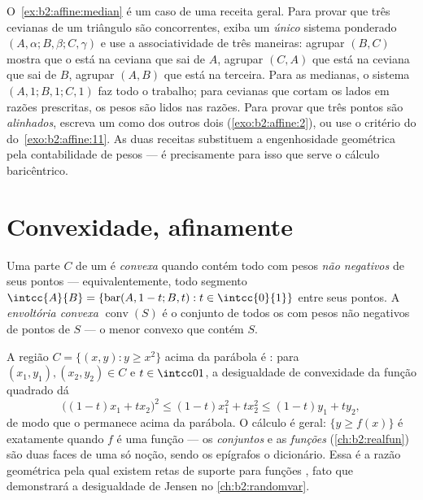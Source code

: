 \begin{remark}
O~\cref{ex:b2:affine:median} é um caso de uma
receita geral. Para provar que três cevianas de um triângulo são
concorrentes, exiba um \emph{único} sistema ponderado $(A,
\alpha; B, \beta; C, \gamma)$ e use a associatividade de três
maneiras: agrupar $(B, C)$ mostra que o  está na
ceviana que sai de $A$, agrupar $(C, A)$ que está na ceviana que sai de $B$,
agrupar $(A, B)$ que está na terceira. Para as medianas, o sistema
$(A, 1; B, 1; C, 1)$ faz todo o trabalho; para cevianas que cortam
os lados em razões prescritas, os pesos são lidos nas
razões. Para provar que três pontos são \emph{alinhados}, escreva um como
 dos outros dois (\cref{exo:b2:affine:2}), ou use
o critério do  do~\cref{exo:b2:affine:11}. As duas
receitas substituem a engenhosidade geométrica pela contabilidade de pesos ---
é precisamente para isso que serve o cálculo baricêntrico.
\end{remark}

\section{Convexidade, afinamente}

\begin{definition}\label{def:b2:affine:convex}
Uma parte $C$ de um  é \emph{convexa} quando contém
todo  com pesos \emph{não negativos} de seus pontos ---
equivalentemente, todo segmento $\intcc{A}{B} = \{\operatorname{bar}(A,
1-t; B, t) : t \in \intcc{0}{1}\}$ entre seus pontos. A
\emph{envoltória convexa} $\operatorname{conv}(S)$ é o conjunto de todos os
 com pesos não negativos de pontos de $S$ --- o menor
convexo que contém $S$.
\end{definition}

\begin{example}\label{ex:b2:affine:epigraph}
A região $C = \{(x, y) : y \geq x^2\}$ acima da parábola
é : para $(x_1, y_1), (x_2, y_2) \in C$ e $t \in
\intcc01$, a desigualdade de convexidade da função quadrado
dá
\[
\bigl((1-t)x_1 + tx_2\bigr)^2 \leq (1-t)x_1^2 + tx_2^2
\leq (1-t)y_1 + ty_2 ,
\]
de modo que o  permanece acima da parábola. O cálculo
é geral: $\{y \geq f(x)\}$ é  exatamente quando $f$ é uma
função  --- os \emph{conjuntos}  e as \emph{funções}
 (\cref{ch:b2:realfun}) são duas faces de uma só
noção, sendo os epígrafos o dicionário. Essa é a razão geométrica
pela qual existem retas de suporte para funções , fato
que demonstrará a desigualdade de Jensen no
\cref{ch:b2:randomvar}.
\end{example}

